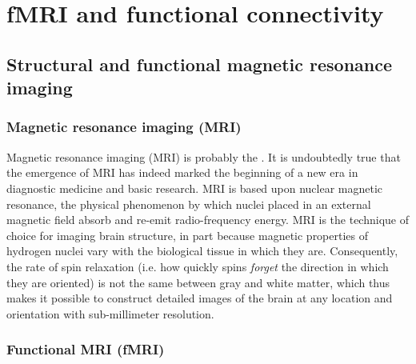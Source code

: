 \cleardoublepage

\chapter{fMRI and functional connectivity }
\label{sec:fmri}

\section{Structural and functional magnetic resonance imaging}
\label{sec:fmri:fmri}

\subsection{Magnetic resonance imaging (MRI)}
\label{sec:fmri:fmri:mri}

Magnetic resonance imaging (MRI) is probably the  \citep{logothetis_what_2008}. It is undoubtedly true that the emergence of MRI has indeed marked the beginning of a new era in diagnostic medicine and basic research. MRI is based upon nuclear magnetic resonance, the physical phenomenon by which nuclei placed in an external magnetic field absorb and re-emit radio-frequency energy. MRI is the technique of choice for imaging brain structure, in part because magnetic properties of hydrogen nuclei vary with the biological tissue in which they are. Consequently, the rate of spin relaxation (i.e. how quickly spins \emph{forget} the direction in which they are oriented) is not the same between gray and white matter, which thus makes it possible to construct detailed images of the brain at any location and orientation with sub-millimeter resolution.

\subsection{Functional MRI (fMRI)}
\label{sec:fmri:fmri:fmri}

